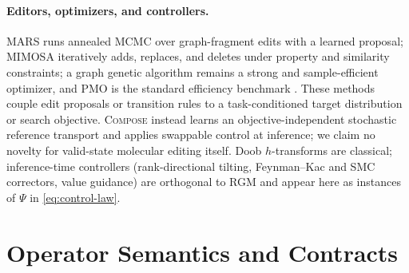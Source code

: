 \documentclass{article}
\newcommand{\method}{\textsc{Compose}\xspace}
\newcommand{\rgm}{\textsc{RGM}\xspace}
\theoremstyle{definition}
\theoremstyle{remark}
\begin{document}
\paragraph{Editors, optimizers, and controllers.}
MARS runs annealed MCMC over graph-fragment edits with a learned proposal; MIMOSA iteratively adds, replaces, and deletes under property and similarity constraints; a graph genetic algorithm remains a strong and sample-efficient optimizer, and PMO is the standard efficiency benchmark \citep{xie2021mars,fu2021mimosa,jensen2019graphga,gao2022pmo}. These methods couple edit proposals or transition rules to a task-conditioned target distribution or search objective. \method instead learns an objective-independent stochastic reference transport and applies swappable control at inference; we claim no novelty for valid-state molecular editing itself. Doob $h$-transforms are classical; inference-time controllers (rank-directional tilting, Feynman--Kac and SMC correctors, value guidance) are orthogonal to \rgm and appear here as instances of $\Psi$ in \eqref{eq:control-law}.


\section{Operator Semantics and Contracts}\label{app:operators}
\end{document}
